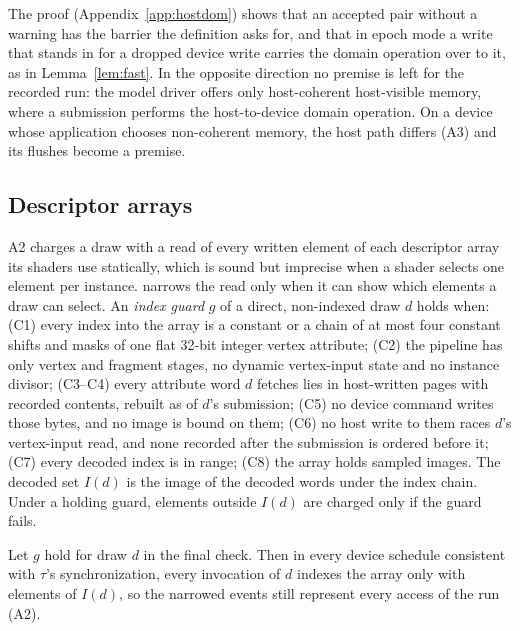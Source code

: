 The proof (Appendix~\ref{app:hostdom}) shows that an accepted pair without a warning has the barrier the definition
asks for, and that in epoch mode a write that stands in for a dropped device write carries the domain operation over to
it, as in Lemma~\ref{lem:fast}. In the opposite direction no premise is left for the recorded run: the model driver
offers only host-coherent host-visible memory, where a submission performs the host-to-device domain operation. On a
device whose application chooses non-coherent memory, the host path differs (A3) and its flushes become a premise.

\subsection{Descriptor arrays}
\label{sec:guards}
A2 charges a draw with a read of every written element of each descriptor array its shaders use statically, which is
sound but imprecise when a shader selects one element per instance. \sys narrows the read only when it can show which
elements a draw can select. An \emph{index guard} $g$ of a direct, non-indexed draw $d$ holds when: (C1) every index
into the array is a constant or a chain of at most four constant shifts and masks of one flat 32-bit integer vertex
attribute; (C2) the pipeline has only vertex and fragment stages, no dynamic vertex-input state and no instance
divisor; (C3--C4) every attribute word $d$ fetches lies in host-written pages with recorded contents, rebuilt as of
$d$'s submission; (C5) no device command writes those bytes, and no image is bound on them; (C6) no host write to them
races $d$'s vertex-input read, and none recorded after the submission is ordered before it; (C7) every decoded index is
in range; (C8) the array holds sampled images. The decoded set $I(d)$ is the image of the decoded words under the
index chain. Under a holding guard, elements outside $I(d)$ are charged only if the guard fails.

\begin{lemma}\label{lem:guard}
Let $g$ hold for draw $d$ in the final check. Then in every device schedule consistent with $\tau$'s synchronization,
every invocation of $d$ indexes the array only with elements of $I(d)$, so the narrowed events still represent every
access of the run (A2).
\end{lemma}

